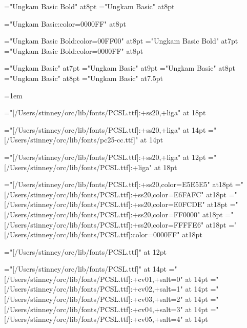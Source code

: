 




\font\slnmfont="Ungkam Basic Bold" at8pt
\font\sltgfont="Ungkam Basic" at8pt


\font\blungkam="Ungkam Basic:color=0000FF" at8pt

\font\slnmfontw="Ungkam Basic Bold:color=00FF00" at8pt
\font\slnmfontx="Ungkam Basic Bold" at7pt
\font\slnmfonty="Ungkam Basic Bold:color=0000FF" at8pt

\font\akafont="Ungkam Basic" at7pt
\font\sldistfont="Ungkam Basic" at9pt
\font\oidfont="Ungkam Basic" at8pt
\font\oidfontx="Ungkam Basic" at8pt
\font\zatufont="Ungkam Basic" at7.5pt

\oidfont{}=1em \showthe{}

\font\pcssXX="[/Users/stinney/orc/lib/fonts/PCSL.ttf]:+ss20,+liga" at 18pt

\font\pcssxx="[/Users/stinney/orc/lib/fonts/PCSL.ttf]:+ss20,+liga" at 14pt
\font\pccc="[/Users/stinney/orc/lib/fonts/pc25-cc.ttf]" at 14pt

\font\pcssxxx="[/Users/stinney/orc/lib/fonts/PCSL.ttf]:+ss20,+liga" at 12pt
\font\pcxviii="[/Users/stinney/orc/lib/fonts/PCSL.ttf]:+liga" at 18pt

\font\pceee="[/Users/stinney/orc/lib/fonts/PCSL.ttf]:+ss20,color=E5E5E5" at18pt
\font\pceff="[/Users/stinney/orc/lib/fonts/PCSL.ttf]:+ss20,color=E6FAFC" at18pt
\font\pcefd="[/Users/stinney/orc/lib/fonts/PCSL.ttf]:+ss20,color=E0FCDE" at18pt
\font\pcfee="[/Users/stinney/orc/lib/fonts/PCSL.ttf]:+ss20,color=FF0000" at18pt
\font\pcffe="[/Users/stinney/orc/lib/fonts/PCSL.ttf]:+ss20,color=FFFFE6" at18pt
\font\pcblu="[/Users/stinney/orc/lib/fonts/PCSL.ttf]:color=0000FF" at18pt

\font\pcringop="[/Users/stinney/orc/lib/fonts/PCSL.ttf]" at 12pt

\font\pcseq="[/Users/stinney/orc/lib/fonts/PCSL.ttf]" at 14pt
\font\pcseqi="[/Users/stinney/orc/lib/fonts/PCSL.ttf]:+cv01,+salt=0" at 14pt
\font\pcseqii="[/Users/stinney/orc/lib/fonts/PCSL.ttf]:+cv02,+salt=1" at 14pt
\font\pcseqiii="[/Users/stinney/orc/lib/fonts/PCSL.ttf]:+cv03,+salt=2" at 14pt
\font\pcseqiv="[/Users/stinney/orc/lib/fonts/PCSL.ttf]:+cv04,+salt=3" at 14pt
\font\pcseqv="[/Users/stinney/orc/lib/fonts/PCSL.ttf]:+cv05,+salt=4" at 14pt

